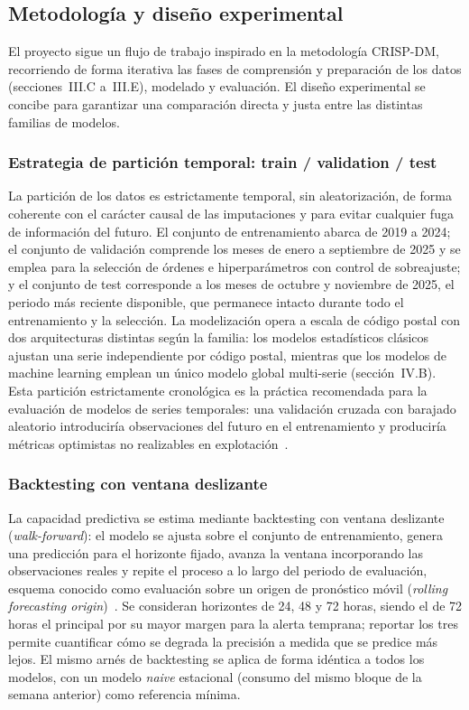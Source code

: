 \documentclass[12pt, a4paper]{article}
\begin{document}
\subsection{Metodología y diseño experimental}

El proyecto sigue un flujo de trabajo inspirado en la metodología CRISP-DM, recorriendo de forma iterativa las fases de comprensión y preparación de los datos (secciones~III.C a~III.E), modelado y evaluación. El diseño experimental se concibe para garantizar una comparación directa y justa entre las distintas familias de modelos.

\subsubsection{Estrategia de partición temporal: train / validation / test}

La partición de los datos es estrictamente temporal, sin aleatorización, de forma coherente con el carácter causal de las imputaciones y para evitar cualquier fuga de información del futuro. El conjunto de entrenamiento abarca de 2019 a 2024; el conjunto de validación comprende los meses de enero a septiembre de 2025 y se emplea para la selección de órdenes e hiperparámetros con control de sobreajuste; y el conjunto de test corresponde a los meses de octubre y noviembre de 2025, el periodo más reciente disponible, que permanece intacto durante todo el entrenamiento y la selección. La modelización opera a escala de código postal con dos arquitecturas distintas según la familia: los modelos estadísticos clásicos ajustan una serie independiente por código postal, mientras que los modelos de machine learning emplean un único modelo global multi-serie (sección~IV.B). Esta partición estrictamente cronológica es la práctica recomendada para la evaluación de modelos de series temporales: una validación cruzada con barajado aleatorio introduciría observaciones del futuro en el entrenamiento y produciría métricas optimistas no realizables en explotación~\cite{hyndman2021}.

\subsubsection{Backtesting con ventana deslizante}

La capacidad predictiva se estima mediante backtesting con ventana deslizante (\textit{walk-forward}): el modelo se ajusta sobre el conjunto de entrenamiento, genera una predicción para el horizonte fijado, avanza la ventana incorporando las observaciones reales y repite el proceso a lo largo del periodo de evaluación, esquema conocido como evaluación sobre un origen de pronóstico móvil (\textit{rolling forecasting origin})~\cite{hyndman2021}. Se consideran horizontes de 24, 48 y 72 horas, siendo el de 72 horas el principal por su mayor margen para la alerta temprana; reportar los tres permite cuantificar cómo se degrada la precisión a medida que se predice más lejos. El mismo arnés de backtesting se aplica de forma idéntica a todos los modelos, con un modelo \textit{naive} estacional (consumo del mismo bloque de la semana anterior) como referencia mínima.
\end{document}
